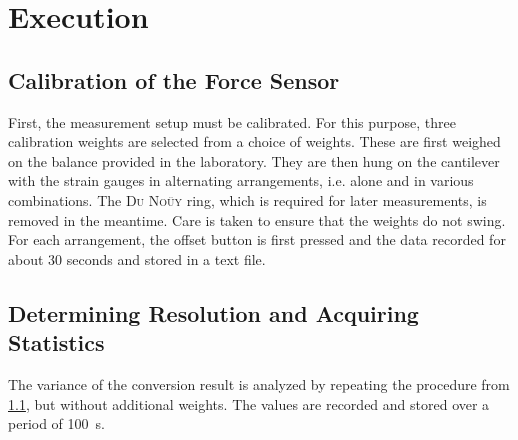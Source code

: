 \chapter{Execution}
    \section{Calibration of the Force Sensor} \label{sec:Calibration}
        First, the measurement setup must be calibrated. For this purpose, three calibration weights are selected from a choice
        of weights. These are first weighed on the balance provided in the laboratory. They are then hung on the cantilever with
        the strain gauges in alternating arrangements, i.e. alone and in various combinations. The \textsc{Du Noüy} ring, which
        is required for later measurements, is removed in the meantime. Care is taken to ensure that the weights do not swing.
        For each arrangement, the offset button is first pressed and the data recorded for about \(30\) seconds and stored in a text
        file.
    \section{Determining Resolution and Acquiring Statistics} \label{sec:Statistics}
        The variance of the conversion result is analyzed by repeating the procedure from \cref{sec:Calibration}, but without
        additional weights. The values are recorded and stored over a period of \SI{100}{s}.
